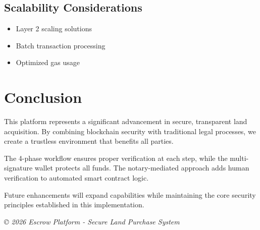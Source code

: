 \documentclass[12pt,a4paper]{article}
\begin{document}
\subsection{Scalability Considerations}
\begin{itemize}
\item Layer 2 scaling solutions
\item Batch transaction processing
\item Optimized gas usage
\end{itemize}

\section{Conclusion}

This platform represents a significant advancement in secure, transparent land acquisition. By combining blockchain security with traditional legal processes, we create a trustless environment that benefits all parties.

The 4-phase workflow ensures proper verification at each step, while the multi-signature wallet protects all funds. The notary-mediated approach adds human verification to automated smart contract logic.

Future enhancements will expand capabilities while maintaining the core security principles established in this implementation.

\vfill
\begin{center}
\textit{© 2026 Escrow Platform - Secure Land Purchase System}
\end{center}
\end{document}
